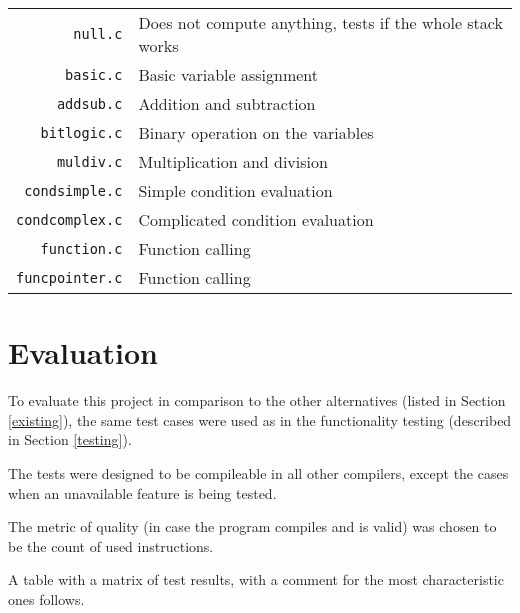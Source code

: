             \begin{center}
            \begin{tabular}{ r | l }
                \texttt{null.c} & Does not compute anything, tests if the whole stack works \\
                \texttt{basic.c} & Basic variable assignment \\
                \texttt{addsub.c} & Addition and subtraction \\
                \texttt{bitlogic.c} & Binary operation on the variables \\
                \texttt{muldiv.c} & Multiplication and division \\
                \texttt{condsimple.c} & Simple condition evaluation \\
                \texttt{condcomplex.c} & Complicated condition evaluation \\
                \texttt{function.c} & Function calling \\
                \texttt{funcpointer.c} & Function calling \\
            \end{tabular}
            \end{center}

    \section{Evaluation}

    To evaluate this project in comparison to the other alternatives (listed in Section \ref{existing}), the same test cases were used as in the functionality testing (described in Section \ref{testing}).

    The tests were designed to be compileable in all other compilers, except the cases when an unavailable feature is being tested.

    The metric of quality (in case the program compiles and is valid) was chosen to be the count of used instructions.

    A table with a matrix of test results, with a comment for the most characteristic ones follows.

